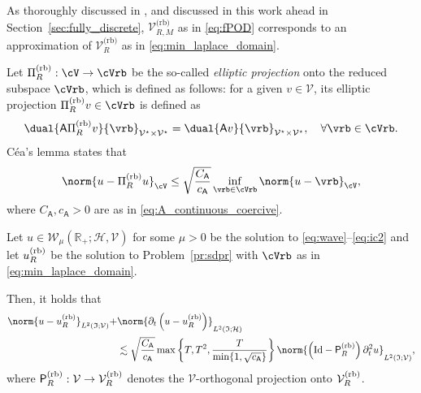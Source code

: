 As thoroughly discussed in \cite{henriquez2024fast}, and discussed in this work ahead in
Section~\ref{sec:fully_discrete}, $\mathcal{V}^{\text{(rb)}}_{R,M}$ as in \eqref{eq:fPOD} corresponds to an approximation of $\mathcal{V}^{\text{(rb)}}_R$ as in \eqref{eq:min_laplace_domain}.

Let  $\Pi^{\text{(rb)}}_R:\cV \to\cVrb$ be the so-called {\it elliptic projection}
onto the reduced subspace $\cVrb$, which is defined as follows: for a given
$v \in \mathcal{V}$, its elliptic projection $\Pi^{\text{(rb)}}_R v \in\cVrb$
is defined as
\begin{align}\label{eq:elliptic_projection}
	\dual{
		\mathsf{A}
		\Pi^{\text{(rb)}}_R v
	}{
		\vrb
	}_{\mathcal{V}^\star \times \mathcal{V}^\star}
	=
	\dual{
		\mathsf{A} v
	}{
		\vrb
	}_{\mathcal{V}^\star \times \mathcal{V}^\star},
	\quad\forall \vrb\in\cVrb.
\end{align}
C\'ea's lemma states that
\begin{align}\label{eq:cea_elliptic_projection}
    \norm{u - \Pi^{\text{(rb)}}_R u}_\cV 
    \leq 
    \sqrt{\frac{C_\mathsf{A}}{c_\mathsf{A}}}
    \inf_{\vrb\in\cVrb}\norm{u-\vrb}_\cV,
\end{align}
where $C_\mathsf{A},c_\mathsf{A}>0$ are as in \eqref{eq:A_continuous_coercive}.

\begin{proposition}\label{eq:best_approximation}
Let $u \in \mathcal{W}_\mu(\mathbb{R}_+;\mathcal{H},\mathcal{V})$ for some $\mu>0$ be the solution to \eqref{eq:wave}--\eqref{eq:ic2} 
and let $u^{\normalfont\text{(rb)}}_R$ be the solution to Problem~\ref{pr:sdpr}
with $\cVrb$ as in \eqref{eq:min_laplace_domain}.

Then, it holds that
\begin{equation}
\begin{aligned}
	\norm{
		u
		-
		u^{\normalfont\text{(rb)}}_R
	}_{L^2(\mathfrak{I};\mathcal{V})}
    +
    &
	\norm{
		\partial_t 
		\left(
			u
			-
			u^{\normalfont\text{(rb)}}_R
		\right)
	}_{L^2(\mathfrak{I};\mathcal{H})}
	\\
	&
    \lesssim
    \sqrt{\frac{C_\mathsf{A}}{c_\mathsf{A}}}
   \max\left\{T,T^2, \frac{T}{\min\{1,\sqrt{ c_{\mathsf{A}} }\}}\right\}
    \norm{
        \left(
            \normalfont\text{Id}
            -
            \mathsf{P}^{\normalfont\text{(rb)}}_R
        \right) \partial^2_t u
    }_{L^2(\mathfrak{I};\mathcal{V})},
\end{aligned}
\end{equation}
where $\mathsf{P}^{\normalfont\text{(rb)}}_R: \mathcal{V} 
\rightarrow \mathcal{V}^{\normalfont\text{(rb)}}_R$ denotes
the $\mathcal{V}$-orthogonal projection onto $\mathcal{V}^{\normalfont\text{(rb)}}_R$.
\end{proposition}

